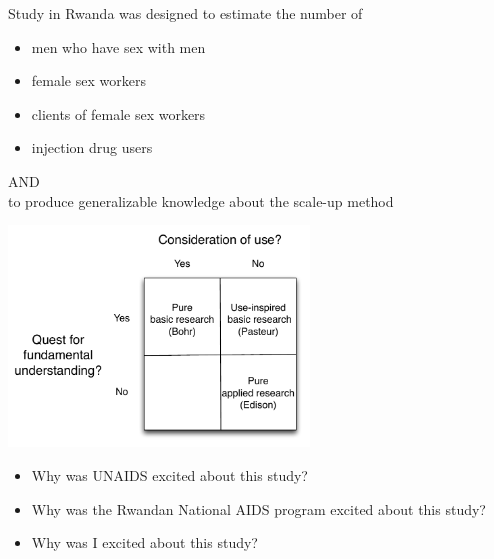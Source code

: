 \documentclass[aspectratio=169]{beamer}
\begin{document}
\begin{frame}

Study in Rwanda was designed to estimate the number of 
\begin{itemize}
\item men who have sex with men
\item female sex workers
\item clients of female sex workers
\item injection drug users
\end{itemize}

\vfill
AND \\
\vfill
to produce generalizable knowledge about the scale-up method

\end{frame}
\begin{frame}

\begin{center}
\includegraphics[width=0.6\textwidth]{figures/pasteurs_quadrant}
\end{center}

\end{frame}
\begin{frame}

\begin{itemize}
\item Why was UNAIDS excited about this study?
\pause
\item Why was the Rwandan National AIDS program excited about this study?
\pause
\item Why was I excited about this study?
\end{itemize}


\end{frame}
\end{document}
